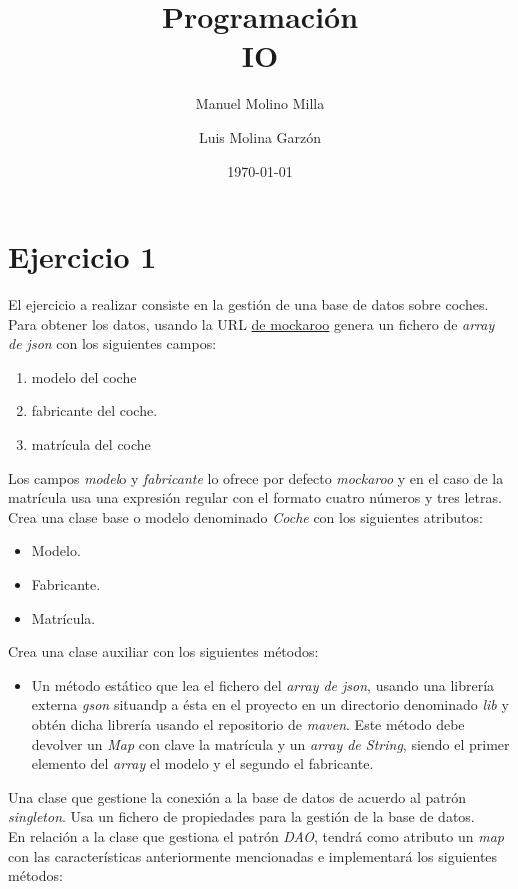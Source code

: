 \documentclass[4paper]{article}
\author{Manuel Molino Milla \and Luis Molina Garzón}
\title{\textbf{Programación}
\\IO}
\date{\today}
\begin{document}
\maketitle


\section*{Ejercicio 1}
El ejercicio a realizar consiste en la gestión de una base de datos sobre coches. Para obtener los datos, usando la URL \href{https://www.mockaroo.com/}{de mockaroo} genera un fichero de \emph{array de json} con los siguientes campos:
\begin{enumerate}
\item modelo del coche
\item fabricante del coche.
\item matrícula del coche
\end{enumerate}
Los campos \emph{model}o y \emph{fabricante} lo ofrece por defecto \emph{mockaroo} y en el caso de la matrícula usa una expresión regular con el formato cuatro números y tres letras.\\
Crea una clase base o modelo denominado \emph{Coche} con los siguientes atributos:
\begin{itemize}
\item Modelo.
\item Fabricante.
\item Matrícula.
\end{itemize}
Crea una clase auxiliar con los siguientes métodos:
\begin{itemize}
\item Un método estático que lea el fichero del \emph{array de json}, usando una librería externa \emph{gson} situandp a ésta en el proyecto en un directorio denominado \emph{lib} y obtén dicha librería usando el repositorio de \emph{maven}. Este método debe devolver un \emph{Map} con clave la matrícula y un \emph{array de String}, siendo el primer elemento del \emph{array} el modelo y el segundo el fabricante.
\end{itemize}
Una clase que gestione la conexión a la base de datos de acuerdo al patrón \emph{singleton}. Usa un fichero de propiedades para la gestión de la base de datos.\\
En relación a la clase que gestiona el patrón \emph{DAO}, tendrá como atributo un \emph{map} con las características anteriormente mencionadas e implementará los siguientes métodos:
\end{document}
